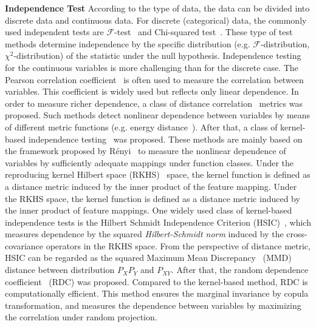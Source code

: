 \documentclass{article}
\begin{document}
\textbf{Independence Test} According to the type of data, the data can be divided into discrete data and continuous data. For discrete (categorical) data, the commonly used independent tests are $\mathcal{F}$-test~\citep{tiku1967tables} and Chi-squared test~\citep{greenwood1996guide}. These type of test methods determine independence by the specific distribution (e.g. $\mathcal{F}$-distribution, $\chi^2$-distribution) of the statistic under the null hypothesis. Independence testing for the continuous variables is more challenging than for the discrete case. The Pearson correlation coefficient~\citep{benesty2009pearson} is often used to measure the correlation between variables. This coefficient is widely used but reflects only linear dependence. In order to measure richer dependence, a class of distance correlation~\citep{szekely2014partial} metrics was proposed. Such methods detect nonlinear dependence between variables by means of different metric functions (e.g. energy distance~\citep{rizzo2016energy}). After that, a class of kernel-based independence testing~\citep{KCC,coco,gretton2003kernel,HSIC} was proposed. These methods are mainly based on the framework proposed by R{\'e}nyi~\citep{renyi1959measures} to measure the nonlinear dependence of variables by sufficiently adequate mappings under function classes. Under the reproducing kernel Hilbert space (RKHS)~\citep{RKHS} space, the kernel function is defined as a distance metric induced by the inner product of the feature mapping. Under the RKHS space, the kernel function is defined as a distance metric induced by the inner product of feature mappings. One widely used class of kernel-based independence tests is the Hilbert Schmidt Independence Criterion (HSIC)~\citep{HSIC}, which measures dependence by the squared \textit{Hilbert-Schmidt norm} induced by the cross-covariance operators in the RKHS space. From the perspective of distance metric, HSIC can be regarded as the squared Maximum Mean Discrepancy~\citep{gretton2012kernel} (MMD) distance between distribution $P_XP_Y$ and $P_{XY}$. After that, the random dependence coefficient~\citep{lopez2013randomized} (RDC) was proposed. Compared to the kernel-based method, RDC is computationally efficient. This method ensures the marginal invariance by copula transformation, and measures the dependence between variables by maximizing the correlation under random projection.
\end{document}
